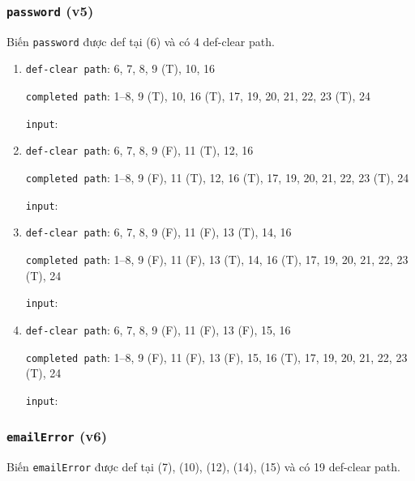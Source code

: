 \documentclass{article}
\begin{document}
\subsubsection*{\texttt{password} (v5)}

\par Biến \texttt{password} được def tại (6) và có 4 def-clear path.

\begin{enumerate}
    \item \texttt{def-clear path}: 6, 7, 8, 9 (T), 10, 16
          \par \texttt{completed path}: 1--8, 9 (T), 10, 16 (T), 17, 19, 20, 21, 22, 23 (T), 24
          \par \texttt{input}:

    \item \texttt{def-clear path}: 6, 7, 8, 9 (F), 11 (T), 12, 16
          \par \texttt{completed path}: 1--8, 9 (F), 11 (T), 12, 16 (T), 17, 19, 20, 21, 22, 23 (T), 24
          \par \texttt{input}:

    \item \texttt{def-clear path}: 6, 7, 8, 9 (F), 11 (F), 13 (T), 14, 16
          \par \texttt{completed path}: 1--8, 9 (F), 11 (F), 13 (T), 14, 16 (T), 17, 19, 20, 21, 22, 23 (T), 24
          \par \texttt{input}:

    \item \texttt{def-clear path}: 6, 7, 8, 9 (F), 11 (F), 13 (F), 15, 16
          \par \texttt{completed path}: 1--8, 9 (F), 11 (F), 13 (F), 15, 16 (T), 17, 19, 20, 21, 22, 23 (T), 24
          \par \texttt{input}:
\end{enumerate}

\subsubsection*{\texttt{emailError} (v6)}

\par Biến \texttt{emailError} được def tại (7), (10), (12), (14), (15) và có 19 def-clear path.
\end{document}
